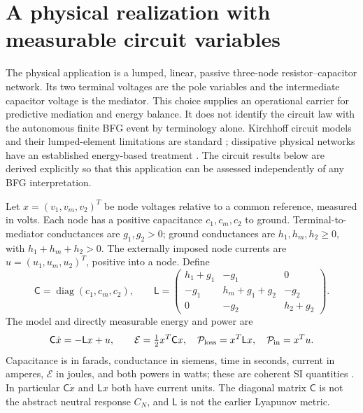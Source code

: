 \documentclass[11pt,letterpaper]{article}
\newcommand{\diag}{\operatorname{diag}}
\theoremstyle{definition}
\numberwithin{equation}{section}
\begin{document}
\section{A physical realization with measurable circuit variables}
The physical application is a lumped, linear, passive three-node resistor--capacitor network. Its two terminal voltages are the pole variables and the intermediate capacitor voltage is the mediator. This choice supplies an operational carrier for predictive mediation and energy balance. It does not identify the circuit law with the autonomous finite BFG event by terminology alone. Kirchhoff circuit models and their lumped-element limitations are standard \cite{mitcircuits}; dissipative physical networks have an established energy-based treatment \cite{schaft}. The circuit results below are derived explicitly so that this application can be assessed independently of any BFG interpretation.

Let $x=(v_1,v_m,v_2)^T$ be node voltages relative to a common reference, measured in volts. Each node has a positive capacitance $c_1,c_m,c_2$ to ground. Terminal-to-mediator conductances are $g_1,g_2>0$; ground conductances are $h_1,h_m,h_2\geq0$, with $h_1+h_m+h_2>0$. The externally imposed node currents are $u=(u_1,u_m,u_2)^T$, positive into a node. Define
\begin{equation}\label{rcmatrices}
\mathsf C=\diag(c_1,c_m,c_2),\qquad
\mathsf L=\begin{pmatrix}h_1+g_1&-g_1&0\\-g_1&h_m+g_1+g_2&-g_2\\0&-g_2&h_2+g_2\end{pmatrix}.
\end{equation}
The model and directly measurable energy and power are
\begin{equation}\label{rclaw}
\mathsf C\dot x=-\mathsf Lx+u,\qquad
\mathcal E=\tfrac12x^T\mathsf Cx,\quad
\mathcal P_{\rm loss}=x^T\mathsf Lx,\quad
\mathcal P_{\rm in}=x^Tu.
\end{equation}
Capacitance is in farads, conductance in siemens, time in seconds, current in amperes, $\mathcal E$ in joules, and both powers in watts; these are coherent SI quantities \cite{nistsi}. In particular $\mathsf C\dot x$ and $\mathsf Lx$ both have current units. The diagonal matrix $\mathsf C$ is not the abstract neutral response $C_N$, and $\mathsf L$ is not the earlier Lyapunov metric.
\end{document}
